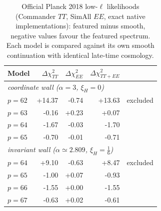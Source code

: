\begin{table}[htbp]\centering
\begin{tabular}{l r r r r}
\hline
Model & $\Delta\chi^2_{TT}$ & $\Delta\chi^2_{EE}$ & $\Delta\chi^2_{TT+EE}$ & \\
\hline
\multicolumn{5}{l}{\emph{coordinate wall ($\alpha=3$, $\xi_H=0$)}} \\
$p=62$ & +14.37 & -0.74 & +13.63 & excluded \\
$p=63$ & -0.16 & +0.23 & +0.07 &  \\
$p=64$ & -1.67 & -0.03 & -1.70 &  \\
$p=65$ & -0.70 & -0.01 & -0.71 &  \\
\hline
\multicolumn{5}{l}{\emph{invariant wall ($\alpha\simeq2.809$, $\xi_H=\tfrac16$)}} \\
$p=64$ & +9.10 & -0.63 & +8.47 & excluded \\
$p=65$ & -1.00 & +0.07 & -0.93 &  \\
$p=66$ & -1.55 & +0.00 & -1.55 &  \\
$p=67$ & -0.63 & +0.02 & -0.61 &  \\
\hline
\end{tabular}
\caption{Official Planck 2018 low-$\ell$ likelihoods (Commander $TT$, SimAll $EE$, exact native implementations): featured minus smooth, negative values favour the featured spectrum. Each model is compared against its own smooth continuation with identical late-time cosmology.}
\label{tab:likelihood}
\end{table}
